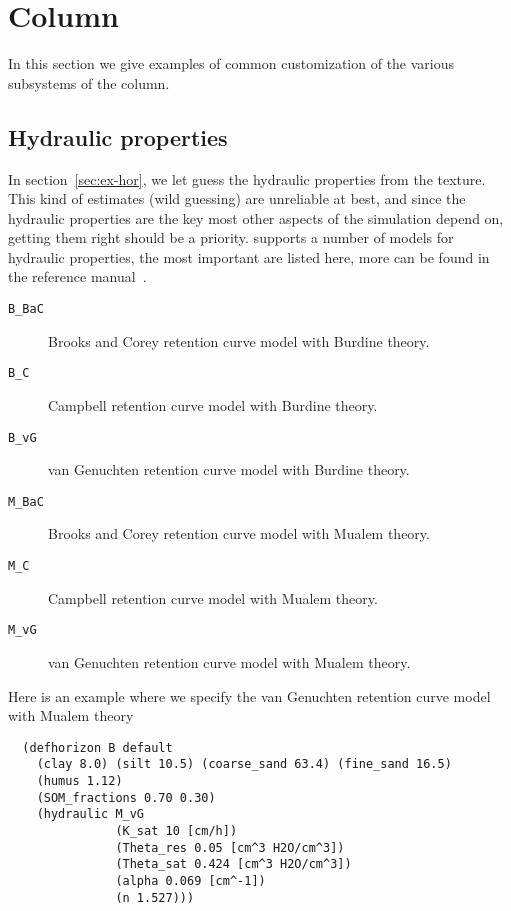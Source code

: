 \documentclass[a4paper,11pt]{article}
\begin{document}
\section{Column}
\label{sec:column}

In this section we give examples of common customization of the
various subsystems of the column.

\subsection{Hydraulic properties}
\label{sec:hydraulic}

In section~\ref{sec:ex-hor}, we let \daisy{} guess the hydraulic
properties from the texture.  This kind of estimates (wild guessing)
are unreliable at best, and since the hydraulic properties are the key
most other aspects of the simulation depend on, getting them right
should be a priority.  \Daisy{} supports a number of models for
hydraulic properties, the most important are listed here, more can be
found in the reference manual~\cite{dina81}.

\begin{description}
\item[\texttt{B\_BaC}] Brooks and Corey retention curve model with
  Burdine theory.
\item[\texttt{B\_C}] Campbell retention curve model with Burdine
  theory.
\item[\texttt{B\_vG}] van Genuchten retention curve model with Burdine
  theory.
\item[\texttt{M\_BaC}] Brooks and Corey retention curve model with
  Mualem theory.
\item[\texttt{M\_C}] Campbell retention curve model with Mualem
  theory.
\item[\texttt{M\_vG}] van Genuchten retention curve model with Mualem
  theory.
\end{description}

Here is an example where we specify the van Genuchten retention curve
model with Mualem theory

\begin{verbatim}
  (defhorizon B default
    (clay 8.0) (silt 10.5) (coarse_sand 63.4) (fine_sand 16.5)
    (humus 1.12)
    (SOM_fractions 0.70 0.30)
    (hydraulic M_vG
               (K_sat 10 [cm/h])
               (Theta_res 0.05 [cm^3 H2O/cm^3])
               (Theta_sat 0.424 [cm^3 H2O/cm^3])
               (alpha 0.069 [cm^-1])
               (n 1.527)))
\end{verbatim}
\end{document}
